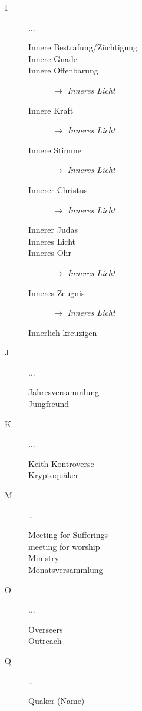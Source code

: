 \begin{description}
\begin{description}
 \end{description}
 \item[I]...
\begin{description}
 \item[Innere Bestrafung/Züchtigung]
 \item[Innere Gnade]
 \item[Innere Offenbarung] $\to$ \textit{Inneres Licht}
 \item[Innere Kraft] $\to$ \textit{Inneres Licht}
 \item[Innere Stimme] $\to$ \textit{Inneres Licht}
 \item[Innerer Christus] $\to$ \textit{Inneres Licht}
 \item[Innerer Judas]
 \item[Inneres Licht]
 \item[Inneres Ohr] $\to$ \textit{Inneres Licht}
 \item[Inneres Zeugnis] $\to$ \textit{Inneres Licht}
 \item[Innerlich kreuzigen]
 \end{description}
 \item[J]...
\begin{description}
 \item[Jahresversammlung]
 \item[Jungfreund]
 \end{description}
 \item[K]...
\begin{description}
 \item[Keith-Kontroverse]
 \item[Kryptoquäker]
 \end{description}
 \item[M]...
\begin{description}
 \item[Meeting for Sufferings]
 \item[meeting for worship]
 \item[Ministry]
 \item[Monatsversammlung]
 \end{description}
 \item[O]...
\begin{description}
 \item[Overseers]
 \item[Outreach]
 \end{description}
 \item[Q]...
\begin{description}
 \item[Quaker (Name)]

\end{description}
\end{description}
